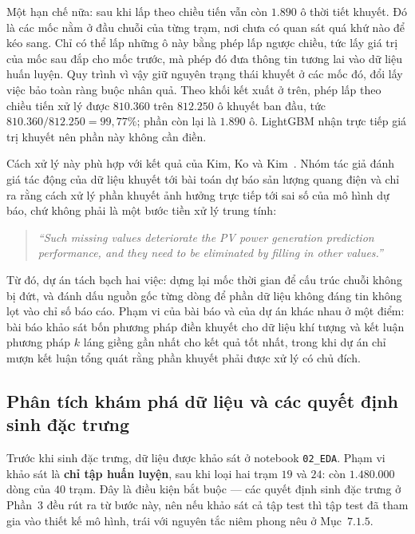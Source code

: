 \documentclass[12pt, a4paper]{report}
\begin{document}
Một hạn chế nữa: sau khi lấp theo chiều tiến vẫn còn $1.890$ ô thời tiết khuyết. Đó là các mốc
nằm ở đầu chuỗi của từng trạm, nơi chưa có quan sát quá khứ nào để kéo sang. Chỉ có thể lấp
những ô này bằng phép lấp ngược chiều, tức lấy giá trị của mốc sau đắp cho mốc trước, mà phép đó
đưa thông tin tương lai vào dữ liệu huấn luyện. Quy trình vì vậy giữ nguyên trạng thái khuyết
ở các mốc đó, đổi lấy việc bảo toàn ràng buộc nhân quả. Theo khối kết xuất ở trên, phép lấp
theo chiều tiến xử lý được $810.360$ trên $812.250$ ô khuyết ban đầu, tức
$810.360 / 812.250 = 99{,}77\%$; phần còn lại là $1.890$ ô. LightGBM nhận trực tiếp giá trị
khuyết nên phần này không cần điền.

Cách xử lý này phù hợp với kết quả của Kim, Ko và Kim~\cite{kim2019missing}. Nhóm tác
giả đánh giá tác động của dữ liệu khuyết tới bài toán dự báo sản lượng quang điện và
chỉ ra rằng cách xử lý phần khuyết ảnh hưởng trực tiếp tới sai số của mô hình dự báo,
chứ không phải là một bước tiền xử lý trung tính:

\begin{quote}\small
\textit{``Such missing values deteriorate the PV power generation prediction performance, and they need to be eliminated by filling in other values.''}
\end{quote}


Từ đó, dự án tách bạch hai việc: dựng lại mốc thời gian để cấu trúc chuỗi
không bị đứt, và đánh dấu nguồn gốc từng dòng để phần dữ liệu không đáng tin
không lọt vào chỉ số báo cáo. Phạm vi của bài báo và của dự án khác nhau ở một điểm: bài báo khảo
sát bốn phương pháp điền khuyết cho dữ liệu khí tượng và kết luận phương pháp
$k$ láng giềng gần nhất cho kết quả tốt nhất, trong khi dự án chỉ mượn kết luận tổng
quát rằng phần khuyết phải được xử lý có chủ đích.

\FloatBarrier
\subsection{Phân tích khám phá dữ liệu và các quyết định sinh đặc trưng}

Trước khi sinh đặc trưng, dữ liệu được khảo sát ở notebook \texttt{02\_EDA}. Phạm vi khảo sát là
\textbf{chỉ tập huấn luyện}, sau khi loại hai trạm $19$ và $24$: còn $1.480.000$ dòng của
$40$ trạm. Đây là điều kiện bắt buộc --- các quyết định sinh đặc trưng ở Phần~$3$ đều rút ra
từ bước này, nên nếu khảo sát cả tập test thì tập test đã tham gia vào thiết kế mô hình,
trái với nguyên tắc niêm phong nêu ở Mục~$7.1.5$.
\end{document}
